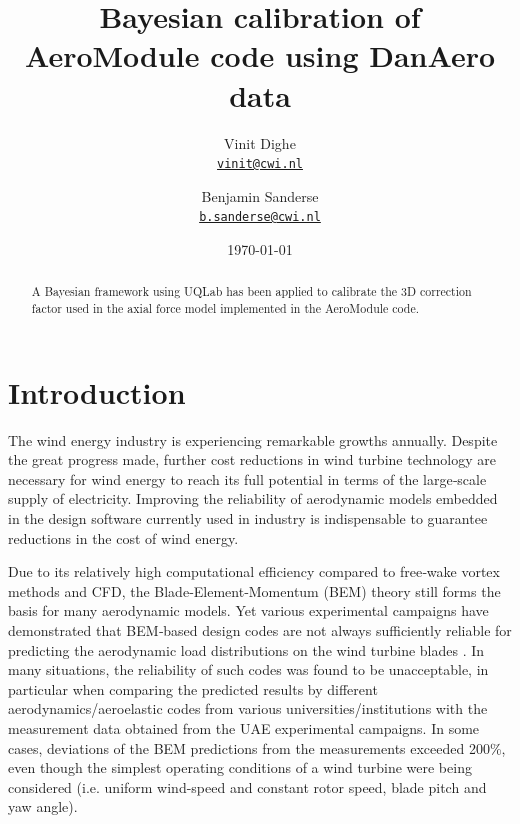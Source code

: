 \documentclass[11pt]{article}
\title{Bayesian calibration of AeroModule code using DanAero data
}
\author{Vinit Dighe\\%
    \href{mailto:vinit@cwi.nl}{\texttt{vinit@cwi.nl}} %
\and Benjamin Sanderse\\%
    \href{mailto:b.sanderse@cwi.nl}{\texttt{b.sanderse@cwi.nl}} %
    }
\date{\today}
\begin{document}
{
\maketitle
\begin{abstract}

\noindent A Bayesian framework using UQLab has been applied to calibrate the 3D correction factor used in the  axial force model implemented in the AeroModule code.   %

\noindent

\end{abstract}
}


\section{Introduction}


The wind energy industry is experiencing remarkable growths annually. Despite the great progress made, further cost reductions in wind turbine technology are necessary for wind energy to reach its full potential in terms of the large‐scale supply of electricity. Improving the reliability of aerodynamic models embedded in the design software currently used in industry is indispensable to guarantee reductions in the cost of wind energy.

Due to its relatively high computational efficiency compared to free‐wake vortex methods and CFD, the Blade‐Element‐Momentum (BEM) theory still forms the basis for many aerodynamic models. Yet various experimental campaigns have demonstrated that BEM‐based design codes are not always sufficiently reliable for predicting the aerodynamic load distributions on the wind turbine blades \citep{UAE_exp}. In many situations, the reliability of such codes was found to be unacceptable, in particular when comparing the predicted results by different aerodynamics/aeroelastic codes from various universities/institutions with the measurement data obtained from the UAE experimental campaigns. In some cases, deviations of the BEM predictions from the measurements exceeded 200\%, even though the simplest operating conditions of a wind turbine were being considered (i.e. uniform wind-speed and constant rotor speed, blade pitch and yaw angle). 
\end{document}
